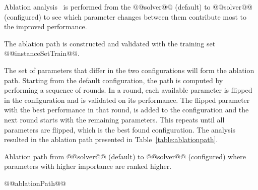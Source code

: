 \documentclass[british]{article}
\newif\iftest
\begin{document}
    Ablation analysis~\cite{FawcettHoos16} is performed from the @@solver@@ (default) to @@solver@@ (configured) to see which parameter changes between them contribute most to the improved performance.
    \iftest
    The ablation path uses the training set @@instanceSetTrain@@ and validation is perform on the test set @@instanceSetTest@@.
    \else
    The ablation path is constructed and validated with the training set @@instanceSetTrain@@.
    \fi
    The set of parameters that differ in the two configurations will form the ablation path.
    Starting from the default configuration, the path is computed by performing a sequence of rounds.
    In a round, each available parameter is flipped in the configuration and is validated on its performance.
    The flipped parameter with the best performance in that round, is added to the configuration and the next round starts with the remaining parameters.
    This repeats until all parameters are flipped, which is the best found configuration.
    The analysis resulted in the ablation path presented in Table~\ref{table:ablationpath}.


    \begin{table}[htbp]
        \caption{Ablation path from @@solver@@ (default) to @@solver@@ (configured) where parameters with higher importance are ranked higher.}
        \label{table:ablationpath}
        \begin{center}
        \footnotesize
            @@ablationPath@@
        \end{center}
    \end{table}

\fi %



\end{document}
